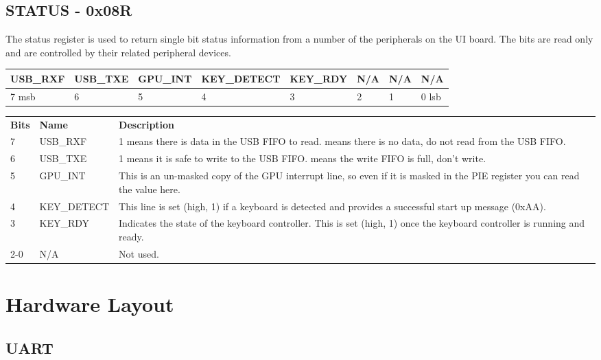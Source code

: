 \documentclass[a4paper,10pt]{book}
\begin{document}
\section{STATUS - 0x08R}
The status register is used to return single bit status information from a
number of the peripherals on the UI board.  The bits are read only and are
controlled by their related peripheral devices.
\vspace{12pt}

\noindent
\begin{tabularx}{\textwidth}{| X | X | X | X | X | X | X | X |}
 \hline
  USB\_RXF&USB\_TXE&GPU\_INT&KEY\_DETECT&KEY\_RDY&N/A&N/A&N/A\\
 \hline
  7 msb&6&5&4&3&2&1&0 lsb\\
 \hline
\end{tabularx}
\vspace{12pt}

\noindent
\begin{tabular}{llp{9cm}}
 \textbf{Bits}&\textbf{Name}&\textbf{Description}\\
 7&USB\_RXF&1 means there is data in the USB FIFO to read.\newline0 means there is no data, do not read from the USB FIFO.\\
 6&USB\_TXE&1 means it is safe to write to the USB FIFO.\newline0 means the write FIFO is full, don't write.\\
 5&GPU\_INT&This is an un-masked copy of the GPU interrupt line, so even if it is
 masked in the PIE register you can read the value here.\\
 4&KEY\_DETECT&This line is set (high, 1) if a keyboard is detected and provides
  a successful start up message (0xAA).\\
 3&KEY\_RDY&Indicates the state of the keyboard controller.  This is set
  (high, 1) once the keyboard controller is running and ready.\\
 2-0&N/A&Not used.\\
\end{tabular}



\chapter{Hardware Layout}
\section{UART}
\end{document}
